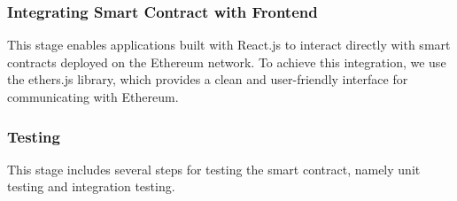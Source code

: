 \subsubsection{Integrating Smart Contract with Frontend}
This stage enables applications built with React.js to interact directly with smart contracts deployed on the Ethereum network. To achieve this integration, we use the ethers.js library, which provides a clean and user-friendly interface for communicating with Ethereum.


\subsubsection{Testing}
This stage includes several steps for testing the smart contract, namely unit testing and integration testing.



